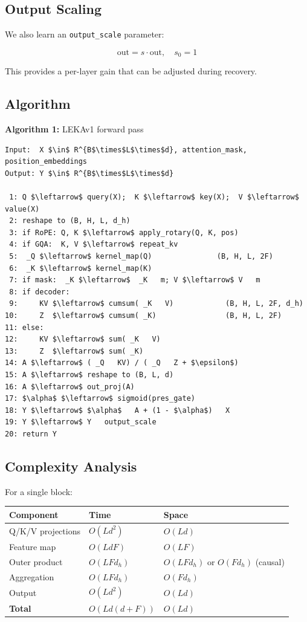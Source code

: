 \subsection{Output Scaling}

We also learn an \texttt{output\_scale} parameter:

\[
\text{out} = s \cdot \text{out}, \quad s_0 = 1
\tag{4.15}
\]

This provides a per-layer gain that can be adjusted during recovery.

\subsection{Algorithm}

\textbf{Algorithm 1:} LEKAv1 forward pass
\begin{lstlisting}
Input:  X $\in$ R^{B$\times$L$\times$d}, attention_mask, position_embeddings
Output: Y $\in$ R^{B$\times$L$\times$d}

 1: Q $\leftarrow$ query(X);  K $\leftarrow$ key(X);  V $\leftarrow$ value(X)
 2: reshape to (B, H, L, d_h)
 3: if RoPE: Q, K $\leftarrow$ apply_rotary(Q, K, pos)
 4: if GQA:  K, V $\leftarrow$ repeat_kv
 5:  _Q $\leftarrow$ kernel_map(Q)               (B, H, L, 2F)
 6:  _K $\leftarrow$ kernel_map(K)
 7: if mask:  _K $\leftarrow$  _K   m; V $\leftarrow$ V   m
 8: if decoder:
 9:     KV $\leftarrow$ cumsum( _K   V)            (B, H, L, 2F, d_h)
10:     Z  $\leftarrow$ cumsum( _K)                (B, H, L, 2F)
11: else:
12:     KV $\leftarrow$ sum( _K   V)
13:     Z  $\leftarrow$ sum( _K)
14: A $\leftarrow$ ( _Q   KV) / ( _Q   Z + $\epsilon$)
15: A $\leftarrow$ reshape to (B, L, d)
16: A $\leftarrow$ out_proj(A)
17: $\alpha$ $\leftarrow$ sigmoid(pres_gate)
18: Y $\leftarrow$ $\alpha$   A + (1 - $\alpha$)   X
19: Y $\leftarrow$ Y   output_scale
20: return Y
\end{lstlisting}

\subsection{Complexity Analysis}

For a single block:

\begin{table}[H]
\centering
\small
\begin{tabular}{lll}
\toprule
\textbf{Component} & \textbf{Time} & \textbf{Space} \\
\midrule
Q/K/V projections & $O(L d^2)$ & $O(L d)$ \\
Feature map & $O(L d F)$ & $O(L F)$ \\
Outer product & $O(L F d_h)$ & $O(L F d_h)$ or $O(F d_h)$ (causal) \\
Aggregation & $O(L F d_h)$ & $O(F d_h)$ \\
Output & $O(L d^2)$ & $O(L d)$ \\
\textbf{Total} & $O(L d (d + F))$ & $O(L d)$ \\
\bottomrule
\end{tabular}
\end{table}

